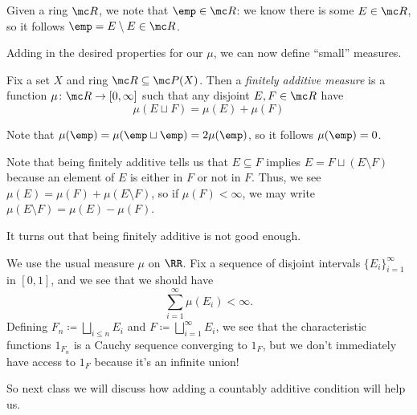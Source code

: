 \documentclass[../notes.tex]{subfiles}
\begin{document}
\begin{remark} \label{rem:emp-is-in-ring}
	Given a ring $\mc R$, we note that $\emp\in\mc R$: we know there is some $E\in\mc R$, so it follows $\emp=E\setminus E\in\mc R$.
\end{remark}
Adding in the desired properties for our $\mu$, we can now define ``small'' measures.
\begin{definition}
	Fix a set $X$ and ring $\mc R\subseteq\mc P(X)$. Then a \textit{finitely additive measure} is a function $\mu\colon\mc R\to[0,\infty]$ such that any disjoint $E,F\in\mc R$ have
	\[\mu(E\sqcup F)=\mu(E)+\mu(F)\]
\end{definition}
\begin{remark}
	Note that $\mu(\emp)=\mu(\emp\sqcup\emp)=2\mu(\emp)$, so it follows $\mu(\emp)=0$.
\end{remark}
\begin{remark} \label{rem:fin-additive-is-subtractive}
	Note that being finitely additive tells us that $E\subseteq F$ implies $E=F\sqcup(E\setminus F)$ because an element of $E$ is either in $F$ or not in $F$. Thus, we see $\mu(E)=\mu(F)+\mu(E\setminus F)$, so if $\mu(F)<\infty$, we may write $\mu(E\setminus F)=\mu(E)-\mu(F)$.
\end{remark}
It turns out that being finitely additive is not good enough.
\begin{example} \label{ex:want-countable-union}
	We use the usual measure $\mu$ on $\RR$. Fix a sequence of disjoint intervals $\{E_i\}_{i=1}^\infty$ in $[0,1]$, and we see that we should have
	\[\sum_{i=1}^\infty\mu(E_i)<\infty.\]
	Defining $F_n\coloneqq\bigsqcup_{i\le n}E_i$ and $F\coloneqq\bigsqcup_{i=1}^\infty E_i$, we see that the characteristic functions $1_{F_n}$ is a Cauchy sequence converging to $1_F$, but we don't immediately have access to $1_F$ because it's an infinite union!
\end{example}
So next class we will discuss how adding a countably additive condition will help us.
\end{document}
